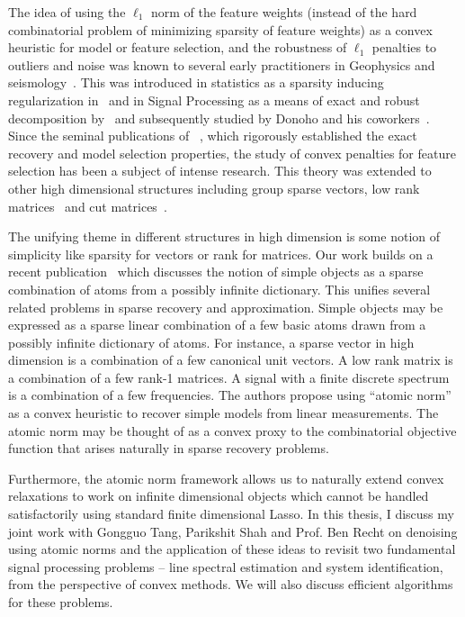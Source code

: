 The idea of using the $\ell_1$ norm of the feature weights (instead of the hard
combinatorial problem of minimizing sparsity of feature weights) as a convex
heuristic for model or feature selection, and the robustness of $\ell_1$
penalties to outliers and noise was known to several early practitioners in
Geophysics and
seismology~\cite{claerbout:robust,taylor:deconvolution,levy:spike-train,santosa}.
This was introduced in statistics as a sparsity inducing regularization
in~\cite{tibshirani96} and in Signal Processing as a means of exact and robust
decomposition by~\cite{chen98} and subsequently studied by Donoho and his
coworkers~\cite{donoho:huo,spark}. Since the seminal publications of
~\cite{CRT06,meinshausen:variable-selection}, which rigorously established the exact recovery and model selection properties, the study of convex penalties for
feature selection has been a subject of intense research. This theory was
extended to other high dimensional structures including group sparse
vectors\cite{group:lasso}, low rank matrices~\cite{recht07} and cut
matrices~\cite{cut:goemans}.


The unifying theme in different structures in high dimension is some notion of
simplicity like sparsity for vectors or rank for matrices. Our work builds on a
recent publication~\cite{crpw} which discusses the notion of simple objects as a
sparse combination of atoms from a possibly infinite dictionary. This unifies
several related problems in sparse recovery and approximation. Simple objects
may be expressed as a sparse linear combination of a few basic atoms drawn from
a possibly infinite dictionary of atoms. For instance, a sparse vector in high
dimension is a combination of a few canonical unit vectors. A low rank matrix is
a combination of a few rank-1 matrices. A signal with a finite discrete spectrum
is a combination of a few frequencies. The authors propose using ``atomic norm''
as a convex heuristic to recover simple models from linear measurements. The
atomic norm may be thought of as a convex proxy to the combinatorial objective
function that arises naturally in sparse recovery problems.

Furthermore, the atomic norm framework allows us to naturally extend convex
relaxations to work on infinite dimensional objects which cannot be handled
satisfactorily using standard finite dimensional Lasso. In this thesis, I
discuss my joint work with Gongguo Tang, Parikshit Shah and Prof. Ben Recht on
denoising using atomic norms and the application of these ideas to revisit two
fundamental signal processing problems -- line spectral estimation and system
identification, from the perspective of convex methods. We will also discuss
efficient algorithms for these problems.

